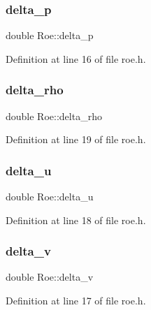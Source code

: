 \subsubsection{\texorpdfstring{delta\+\_\+p}{delta\_p}}
{\footnotesize\ttfamily double Roe\+::delta\+\_\+p\hspace{0.3cm}{\ttfamily [private]}}



Definition at line 16 of file roe.\+h.

\mbox{\label{classRoe_ae55c922cabd317fc9f102eb81b75ffc6}} 
\subsubsection{\texorpdfstring{delta\+\_\+rho}{delta\_rho}}
{\footnotesize\ttfamily double Roe\+::delta\+\_\+rho\hspace{0.3cm}{\ttfamily [private]}}



Definition at line 19 of file roe.\+h.

\mbox{\label{classRoe_acfbc516a21100db263165a5af5f5d5e8}} 
\subsubsection{\texorpdfstring{delta\+\_\+u}{delta\_u}}
{\footnotesize\ttfamily double Roe\+::delta\+\_\+u\hspace{0.3cm}{\ttfamily [private]}}



Definition at line 18 of file roe.\+h.

\mbox{\label{classRoe_a430b1d9011401ad7c5c7ca289f540a6c}} 
\subsubsection{\texorpdfstring{delta\+\_\+v}{delta\_v}}
{\footnotesize\ttfamily double Roe\+::delta\+\_\+v\hspace{0.3cm}{\ttfamily [private]}}



Definition at line 17 of file roe.\+h.

